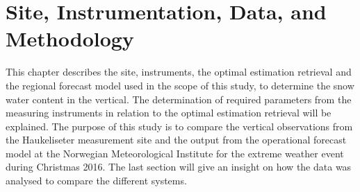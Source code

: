 \chapter{Site, Instrumentation, Data, and Methodology}\label{ch:Methods}

This chapter describes the site, instruments, the optimal estimation retrieval and the regional forecast model used in the scope of this study, to determine the snow water content in the vertical. The determination of required parameters from the measuring instruments in relation to the optimal estimation retrieval will be explained. The purpose of this study is to compare the vertical observations from the Haukeliseter measurement site and the output from the operational forecast model at the Norwegian Meteorological Institute for the extreme weather event during Christmas 2016. 
The last section will give an insight on how the data was analysed to compare the different systems. 










